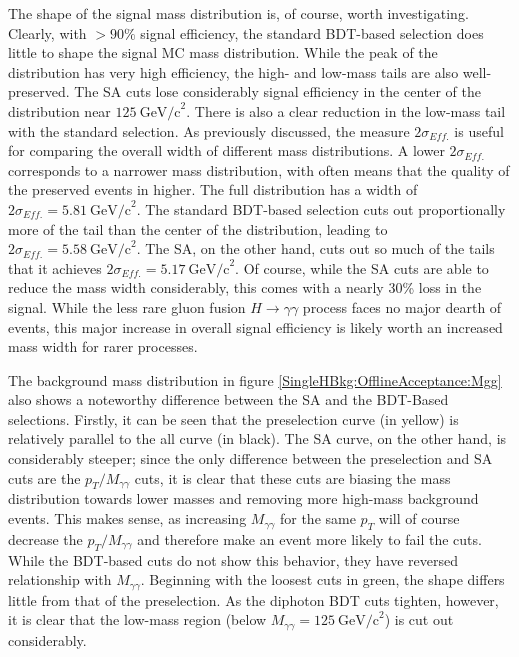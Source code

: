 \documentclass[12pt]{ucsddissertation}
\begin{document}
The shape of the signal mass distribution is, of course, worth investigating. Clearly, with $>90\%$ signal efficiency, the standard BDT-based selection does little to shape the signal MC mass distribution. While the peak of the distribution has very high efficiency, the high- and low-mass tails are also well-preserved. The SA cuts lose considerably signal efficiency in the center of the distribution near $125 \ \mathrm{GeV/c}^2$. There is also a clear reduction in the low-mass tail with the standard selection. As previously discussed, the measure $2\sigma_{Eff.}$ is useful for comparing the overall width of different mass distributions. A lower $2\sigma_{Eff.}$ corresponds to a narrower mass distribution, with often means that the quality of the preserved events in higher. The full distribution has a width of $2\sigma_{Eff.} = 5.81 \ \mathrm{GeV/c}^2$. The standard BDT-based selection cuts out proportionally more of the tail than the center of the distribution, leading to $2\sigma_{Eff.} = 5.58 \ \mathrm{GeV/c}^2$. The SA, on the other hand, cuts out so much of the tails that it achieves $2\sigma_{Eff.} = 5.17 \ \mathrm{GeV/c}^2$. Of course, while the SA cuts are able to reduce the mass width considerably, this comes with a nearly 30\% loss in the signal. While the less rare gluon fusion $H \rightarrow \gamma \gamma$ process faces no major dearth of events, this major increase in overall signal efficiency is likely worth an increased mass width for rarer processes.

The background mass distribution in figure \ref{SingleHBkg:OfflineAcceptance:Mgg} also shows a noteworthy difference between the SA and the BDT-Based selections. Firstly, it can be seen that the preselection curve (in yellow) is relatively parallel to the all curve (in black). The SA curve, on the other hand, is considerably steeper; since the only difference between the preselection and SA cuts are the $p_T/M_{\gamma \gamma}$ cuts, it is clear that these cuts are biasing the mass distribution towards lower masses and removing more high-mass background events. This makes sense, as increasing $M_{\gamma \gamma}$ for the same $p_T$ will of course decrease the $p_T/M_{\gamma \gamma}$ and therefore make an event more likely to fail the cuts. While the BDT-based cuts do not show this behavior, they have reversed relationship with $M_{\gamma \gamma}$. Beginning with the loosest cuts in green, the shape differs little from that of the preselection. As the diphoton BDT cuts tighten, however, it is clear that the low-mass region (below $M_{\gamma \gamma} = 125 \ \mathrm{GeV/c}^2$) is cut out considerably. 
\end{document}
